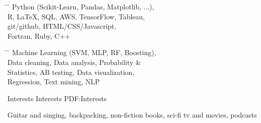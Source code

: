 \documentclass[letterpaper,MMMyyyy,nonstopmode]{simpleresumecv}
\begin{document}
\begin{Body}
\parbox{0.5\textwidth}{ %
\begin{tabbing}
\hspace{3cm} \= \hspace{4cm} \= \kill
\newline
Python (Scikit-Learn, Pandas, Matplotlib, ...), \\
R, LaTeX, SQL, AWS, TensorFlow, Tableau, \\
git/github, HTML/CSS/Javascript, \\
Fortran, Ruby, C++ 
\end{tabbing}}
\hfill %
\parbox{0.5\textwidth}{ %
\begin{tabbing}
\hspace{3cm} \= \hspace{4cm} \= \kill
Machine Learning (SVM, MLP, RF, Boosting), \\
Data cleaning, Data analysis, Probability \& \\
Statistics, AB testing, Data visualization, 
\\Regression, Text mining, NLP
\end{tabbing}}




\Section
{Interests}
{Interests}
{PDF:Interests}

\Entry
Guitar and singing,
backpacking,
non-fiction books,
sci-fi tv and movies,
podcasts





\end{Body}
\end{document}
